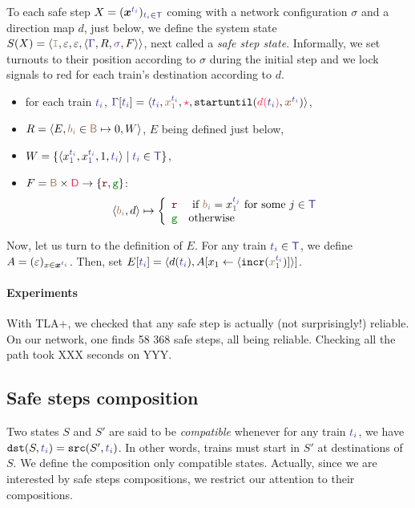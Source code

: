 \documentclass[runningheads]{llncs}
\newcommand{\tuple}[1]{\ensuremath{\langle #1\rangle}}
\newcommand{\directions}{\dirFmt{\mathsf{D}}}
\newcommand{\dirFmt}[1]{{\color{dircolor} #1}}
\newcommand{\dirStop}{\ensuremath{\dirFmt{\star}}\xspace}
\newcommand{\posFmt}[1]{{\color{poscolor}{#1}}}
\newcommand{\blocks}{{\posFmt{\mathsf{B}}}}
\newcommand{\bid}[1]{\ensuremath{\posFmt{b_{#1}}}}
\newcommand{\swFmt}[1]{{\color{swcolor}{#1}}}
\newcommand{\switches}{\ensuremath{\swFmt{\sigma}}}
\newcommand{\trainFmt}[1]{{\color{traincolor} #1}}
\newcommand{\trainTuple}[4]{\langle \trainFmt{#1}, \posFmt{#2}, \dirFmt{#3}, #4 \rangle}
\newcommand{\trainSeq}{\ensuremath{\trainFmt{\Gamma}}\xspace}
\newcommand{\trains}{{\trainFmt{\mathsf{T}}}}
\newcommand{\tid}[1]{\ensuremath{\trainFmt{t_{#1}}}}
\newcommand{\su}[2]{{\mbox{$\mathtt{startuntil}(\dirFmt{#1}, \posFmt{#2})$}}\xspace}
\newcommand{\incr}[1]{{\mbox{\ensuremath{\mathtt{incr}(\posFmt{#1})}}}\xspace}
\newcommand{\regulator}{\ensuremath{R}}
\newcommand{\sigred}{{\mbox{${\color{red!50!black}\mathtt{r}}$}}\xspace}
\newcommand{\siggreen}{{\mbox{${\color{green!50!black}\mathtt{g}}$}}\xspace}
\newcommand{\signals}{\ensuremath{F}}
\newcommand{\stateTuple}[4]{\tuple{#1, #2, #3, #4}}
\newcommand{\guardFmt}[1]{{\color{guardcolor} \ensuremath{\mathtt{#1}}}}
\newcommand{\guardI}{\guardFmt{I}}
\newcommand{\bufferFmt}[1]{#1}
\newcommand{\emptyList}{\ensuremath{\varepsilon}}
\newcommand{\redTuple}[4]{\ensuremath{\tuple{#1, \bufferFmt{#2}, \bufferFmt{#3}, #4}}}
\begin{document}
To each safe step $X = (\vec{x}^{\tid{i}})_{\tid{i} \in \trains}$ coming with a network configuration $\sigma$ and a direction map $d$, just below, we define the system state $S(X) = \redTuple{\guardI}{ \emptyList}{ \emptyList}{\stateTuple{\trainSeq{}}{\regulator}{\switches}{\signals}}$, next called a \emph{safe step state}. Informally, we set turnouts to their position according to $\sigma$ during the initial step  and we lock signals to red for each train's destination according to $d$. 
\begin{itemize}
\item for each train $\tid{i}$, $\trainSeq[\tid{i}] = \trainTuple{\tid{i}}{x_1^{\tid{i}}}{\dirStop}{\su{d(\tid{i})}{\vec{x}^{\tid{i}}}}$,
\item $R = \langle E,  \bid{i} \in \blocks \mapsto 0, W\rangle$, $E$ being defined just below,
\item $W = \{ \tuple{x_1^\tid{i}, x_1^\tid{i}, 1, \tid{i}}  \mid \tid{i} \in \trains \}$, 
\item $F = \blocks \times \directions \to \{\sigred, \siggreen \}$: 
$$\langle \bid{i}, d\rangle \mapsto \left \{ \begin{array}{ll}
\sigred & \text{ if } \bid{i} = x_1^\tid{j}  \text{ for some }j \in \trains\\%
\siggreen & \text{otherwise}
\end{array}\right.
$$
\end{itemize}

Now, let us turn to the definition of $E$. For any train $\tid{i} \in \trains$, we define $A= (\emptyList)_{x \in \vec{x}^\tid{i} }$. Then, set  $E[\tid{i}] = \langle d(\tid{i}), A[x_1 \leftarrow \langle \incr{x_1^\tid{i}}] \rangle]$. 

\paragraph{Experiments}  With TLA+, we checked that any safe step is actually (not surprisingly!) reliable.  On our network, one finds 58 368 safe steps, all being reliable. Checking all the path took XXX seconds on YYY. 

\subsection{Safe steps composition}

Two states $S$ and $S'$ are said to be \emph{compatible} whenever  for any train $\tid{i}$, we have $\mathtt{dst}(S, \tid{i})  =  \mathtt{src}(S', \tid{i})$. In other words, trains must start in $S'$ at destinations of $S$. We define the composition only compatible states. Actually, since we are interested by safe steps compositions, we restrict our attention to their compositions.
  
\end{document}
